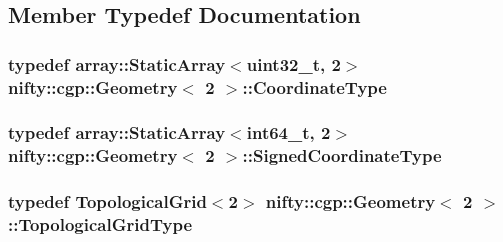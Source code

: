 \subsection{Member Typedef Documentation}
\hypertarget{classnifty_1_1cgp_1_1Geometry_3_012_01_4_ab8abca4eea1550f59dca20f28bd0304d}{}
\subsubsection[{Coordinate\+Type}]{\setlength{\rightskip}{0pt plus 5cm}typedef {\bf array\+::\+Static\+Array}$<$uint32\+\_\+t, 2$>$ {\bf nifty\+::cgp\+::\+Geometry}$<$ 2 $>$\+::{\bf Coordinate\+Type}}\label{classnifty_1_1cgp_1_1Geometry_3_012_01_4_ab8abca4eea1550f59dca20f28bd0304d}
\hypertarget{classnifty_1_1cgp_1_1Geometry_3_012_01_4_a2a2413f5135f7b297a4f703cb5bcb641}{}
\subsubsection[{Signed\+Coordinate\+Type}]{\setlength{\rightskip}{0pt plus 5cm}typedef {\bf array\+::\+Static\+Array}$<$int64\+\_\+t, 2$>$ {\bf nifty\+::cgp\+::\+Geometry}$<$ 2 $>$\+::{\bf Signed\+Coordinate\+Type}}\label{classnifty_1_1cgp_1_1Geometry_3_012_01_4_a2a2413f5135f7b297a4f703cb5bcb641}
\hypertarget{classnifty_1_1cgp_1_1Geometry_3_012_01_4_a6f4a07a376a645097547311fe0ad2836}{}
\subsubsection[{Topological\+Grid\+Type}]{\setlength{\rightskip}{0pt plus 5cm}typedef {\bf Topological\+Grid}$<$2$>$ {\bf nifty\+::cgp\+::\+Geometry}$<$ 2 $>$\+::{\bf Topological\+Grid\+Type}}\label{classnifty_1_1cgp_1_1Geometry_3_012_01_4_a6f4a07a376a645097547311fe0ad2836}


